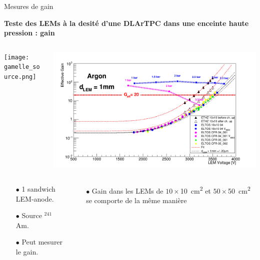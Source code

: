     \begin{frame}{Mesures de gain}
    	\begin{scriptsize}
    		\begin{center}\textbf{Teste des LEMs à la desité d'une DLArTPC dans une enceinte haute pression : gain}\\\end{center}
    		\begin{columns}
    			\begin{column}{0.46\textwidth}
    				\centering \texttt{[image: gamelle\_source.png]}
    			\end{column}\hfill
    			\begin{column}{0.58\textwidth}
    				\centering \includegraphics[width=\textwidth]{./pictures/gain.png}
    			\end{column}
    		\end{columns}\vfill
    		\begin{columns}
    			\begin{column}{0.38\textwidth}
    				\begin{itemize}
    					\item[$\bullet$] 1 sandwich LEM-anode.
    					\item[$\bullet$] Source $^{241}$Am.
    					\item[$\bullet$] Peut mesurer le gain.
    				\end{itemize}
    			\end{column}\hfill
    			\begin{column}{0.58\textwidth}
    				\begin{itemize}
    					\item[$\bullet$] Gain dans les LEMs de $10\times$\SI{10}{\centi\meter\squared} et $50\times$\SI{50}{\centi\meter\squared} se comporte de la même manière
    				\end{itemize}
    			\end{column}
    		\end{columns}
    	\end{scriptsize}
    \end{frame}

